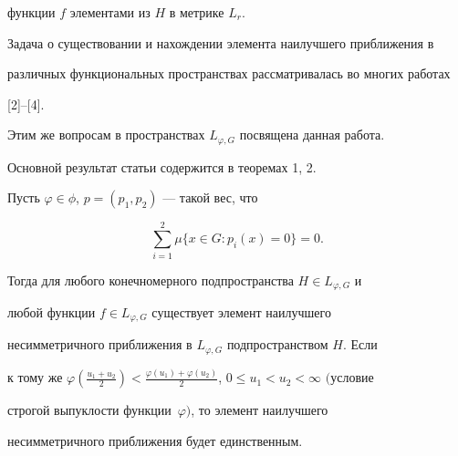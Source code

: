 функции $f$ элементами из $H$ в метрике $L_r$. 


 


Задача о существовании и нахождении элемента наилучшего приближения в 


различных функциональных пространствах рассматривалась во многих работах 


[2]--[4]. 


 


Этим же вопросам в пространствах $L_{\varphi,G}$ посвящена данная работа. 


Основной результат статьи содержится в теоремах 1, 2. 


 


 


\begin{thm} 


Пусть $\varphi\in\phi$, $p=(p_1,p_2)$ --- такой вес, что 


\begin{equation} 


\sum^2_{i=1}\mu\{x\in G:p_i(x)=0\}=0. 


\end{equation} 


Тогда для любого конечномерного подпространства $H\in L_{\varphi,G}$ и 


любой функции $f\in L_{\varphi,G}$ существует элемент наилучшего 


несимметричного приближения в $L_{\varphi,G}$ подпространством $H$. Если 


к тому же $\varphi(\frac{u_1+u_2}{2})< 


\frac{\varphi(u_1)+\varphi(u_2)}{2}$, $0\le u_1<u_2<\infty$ $($условие 


строгой выпуклости функции~$\varphi)$, то элемент наилучшего 


несимметричного приближения будет единственным. 


\end{thm} 


 


 


